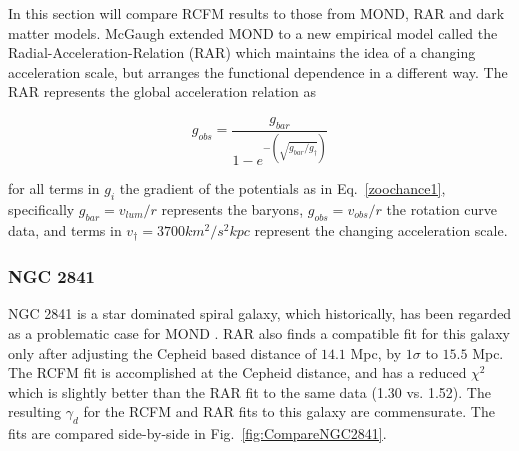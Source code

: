 \documentclass[reprint,%
 amsmath,amssymb,
 aps,
]{revtex4-1}
\begin{document}
   In this section will  
   compare RCFM results to those from MOND, RAR and dark matter models. 
   McGaugh extended MOND to a new empirical model called the Radial-Acceleration-Relation (RAR)  which maintains the idea of a changing acceleration scale, but arranges the functional dependence in a different way. The RAR represents the  global acceleration relation as
   
\begin{equation}
    g_{obs}=\frac{g_{bar}}{1-e^{-(\sqrt{g_{bar}/g_\dagger})}}
    \label{Eq:RAR}
\end{equation}

for all  terms in $g_i$   the gradient of the potentials as in Eq.~\ref{zoochance1}, specifically 
$ g_{bar} = v_{lum}/r$ represents   the baryons,    $g_{obs}= v_{obs}/r$    the rotation curve data, and terms in  $v_\dagger = 3700 km^2/ s^2 kpc$ represent the changing acceleration scale.  

 
 
 
\subsubsection{NGC 2841}

NGC 2841 is a star dominated spiral galaxy, which   historically, has been regarded as a problematic case for MOND  \citet{Gent}.   RAR also finds a compatible  fit for this galaxy only  after adjusting
the Cepheid based  distance of $14.1$ Mpc,  by $1\sigma$ to $15.5$ Mpc. The RCFM fit is accomplished at the Cepheid distance, 
and has a reduced $\chi^2$ which is slightly better than the RAR fit to the same data (1.30 vs. 1.52). The resulting $\gamma_d$ for the RCFM and RAR fits to this galaxy are commensurate.   The fits are compared side-by-side in  Fig.~\ref{fig:CompareNGC2841}. 
\end{document}
